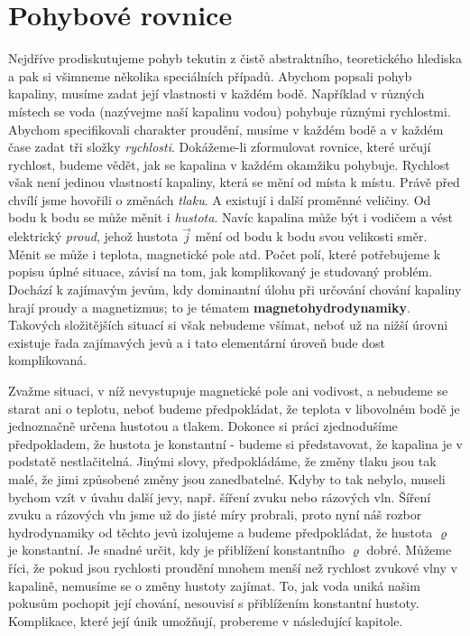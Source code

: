   \section{Pohybové rovnice}\label{fyz:IIchapXLsecII}
    Nejdříve prodiskutujeme pohyb tekutin z čistě abstraktního, teoretického hlediska a pak si 
    všimneme několika speciálních případů. Abychom popsali pohyb kapaliny, musíme zadat její 
    vlastnosti v každém bodě. Například v různých místech se voda (nazývejme naší kapalinu vodou) 
    pohybuje různými rychlostmi. Abychom specifikovali charakter proudění, musíme v každém bodě a v 
    každém čase zadat tři složky \emph{rychlosti}. Dokážeme-li zformulovat rovnice, které určují 
    rychlost, budeme vědět, jak se kapalina v každém okamžiku pohybuje. Rychlost však není jedinou 
    vlastností kapaliny, která se mění od místa k místu. Právě před chvílí jsme hovořili o změnách 
    \emph{tlaku}. A existují i další proměnné veličiny. Od bodu k bodu se může měnit i 
    \emph{hustota}. Navíc kapalina může být i vodičem a vést elektrický \emph{proud}, jehož hustota 
    \(\vec{j}\) mění od bodu k bodu svou velikosti směr. Měnit se může i teplota, magnetické pole 
    atd. Počet polí, které potřebujeme k popisu úplné situace, závisí na tom, jak komplikovaný je 
    studovaný problém. Dochází k zajímavým jevům, kdy dominantní úlohu při určování chování 
    kapaliny hrají proudy a magnetizmus; to je tématem \textbf{magnetohydrodynamiky}. Takových 
    složitějších situací si však nebudeme všímat, neboť už na nižší úrovni existuje řada zajímavých 
    jevů a i tato elementární úroveň bude dost komplikovaná. 
    
    Zvažme situaci, v níž nevystupuje magnetické pole ani vodivost, a nebudeme se starat ani o 
    teplotu, neboť budeme předpokládat, že teplota v libovolném bodě je jednoznačně určena hustotou 
    a tlakem. Dokonce si práci zjednodušíme předpokladem, že hustota je konstantní - budeme si 
    představovat, že kapalina je v podstatě nestlačitelná. Jinými slovy, předpokládáme, že změny 
    tlaku jsou tak malé, že jimi způsobené změny jsou zanedbatelné. Kdyby to tak nebylo, museli 
    bychom vzít v úvahu další jevy, např. šíření zvuku nebo rázových vln. Šíření zvuku a rázových 
    vln jsme už do jisté míry probrali, proto nyní náš rozbor hydrodynamiky od těchto jevů 
    izolujeme a budeme předpokládat, že hustota \(\varrho\) je konstantní. Je snadné určit, kdy je 
    přiblížení konstantního \(\varrho\) dobré. Můžeme říci, že pokud jsou rychlosti proudění mnohem 
    menší než rychlost zvukové vlny v kapalině, nemusíme se o změny hustoty zajímat. To, jak voda 
    uniká našim pokusům pochopit její chování, nesouvisí s přiblížením konstantní hustoty. 
    Komplikace, které její únik umožňují, probereme v následující kapitole. 
    
